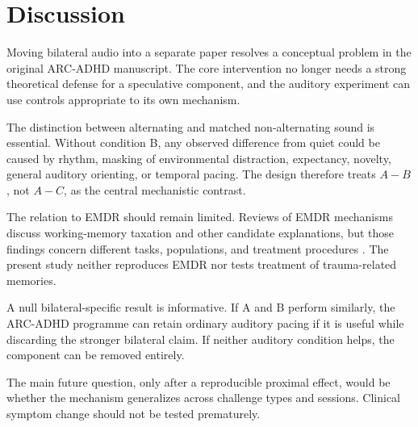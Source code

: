 \section{Discussion}

Moving bilateral audio into a separate paper resolves a conceptual problem in the original ARC-ADHD manuscript. The core intervention no longer needs a strong theoretical defense for a speculative component, and the auditory experiment can use controls appropriate to its own mechanism.

The distinction between alternating and matched non-alternating sound is essential. Without condition B, any observed difference from quiet could be caused by rhythm, masking of environmental distraction, expectancy, novelty, general auditory orienting, or temporal pacing. The design therefore treats \(A-B\), not \(A-C\), as the central mechanistic contrast.

The relation to EMDR should remain limited. Reviews of EMDR mechanisms discuss working-memory taxation and other candidate explanations, but those findings concern different tasks, populations, and treatment procedures \parencite{landinromero2018emdr,wadji2022workingmemory}. The present study neither reproduces EMDR nor tests treatment of trauma-related memories.

A null bilateral-specific result is informative. If A and B perform similarly, the ARC-ADHD programme can retain ordinary auditory pacing if it is useful while discarding the stronger bilateral claim. If neither auditory condition helps, the component can be removed entirely.

The main future question, only after a reproducible proximal effect, would be whether the mechanism generalizes across challenge types and sessions. Clinical symptom change should not be tested prematurely.
